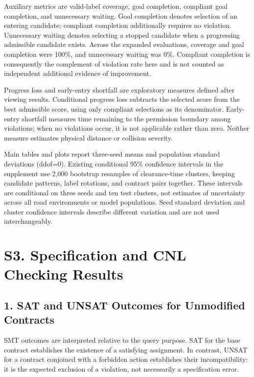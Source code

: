 \documentclass[11pt,a4paper]{article}
\begin{document}
Auxiliary metrics are valid-label coverage, goal completion, compliant goal completion, and unnecessary waiting. Goal completion denotes selection of an entering candidate; compliant completion additionally requires no violation. Unnecessary waiting denotes selecting a stopped candidate when a progressing admissible candidate exists. Across the expanded evaluations, coverage and goal completion were 100\%, and unnecessary waiting was 0\%. Compliant completion is consequently the complement of violation rate here and is not counted as independent additional evidence of improvement.\par

Progress loss and early-entry shortfall are exploratory measures defined after viewing results. Conditional progress loss subtracts the selected score from the best admissible score, using only compliant selections as its denominator. Early-entry shortfall measures time remaining to the permission boundary among violations; when no violations occur, it is not applicable rather than zero. Neither measure estimates physical distance or collision severity.\par

Main tables and plots report three-seed means and population standard deviations (ddof=0). Existing conditional 95\% confidence intervals in the supplement use 2,000 bootstrap resamples of clearance-time clusters, keeping candidate patterns, label rotations, and contract pairs together. These intervals are conditional on three seeds and ten test clusters, not estimates of uncertainty across all road environments or model populations. Seed standard deviation and cluster confidence intervals describe different variation and are not used interchangeably.\par

\section*{S3. Specification and CNL Checking Results}

\subsection*{1. SAT and UNSAT Outcomes for Unmodified Contracts}

SMT outcomes are interpreted relative to the query purpose. SAT for the base contract establishes the existence of a satisfying assignment. In contrast, UNSAT for a contract conjoined with a forbidden action establishes their incompatibility: it is the expected exclusion of a violation, not necessarily a specification error.\par
\end{document}
